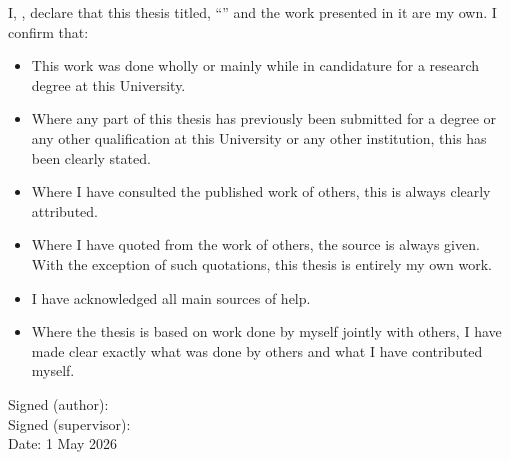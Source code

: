 \documentclass[
11pt, %
oneside, %
ukrainian,
english, %
singlespacing, %
headsepline, %
]{Thesis} %
\begin{document}

\begin{declaration}
\addchaptertocentry{\authorshipname} %
\noindent I, \authorname, declare that this thesis titled, \enquote{\ttitle} and the work presented in it are my own. I confirm that:

\begin{itemize} 
\item This work was done wholly or mainly while in candidature for a research degree at this University.
\item Where any part of this thesis has previously been submitted for a degree or any other qualification at this University or any other institution, this has been clearly stated.
\item Where I have consulted the published work of others, this is always clearly attributed.
\item Where I have quoted from the work of others, the source is always given. With the exception of such quotations, this thesis is entirely my own work.
\item I have acknowledged all main sources of help.
\item Where the thesis is based on work done by myself jointly with others, I have made clear exactly what was done by others and what I have contributed myself.\\
\end{itemize}

\vspace{15em}
\noindent Signed (author): \underline{\hspace{6cm}} \authorname \\
 
\noindent Signed (supervisor): \underline{\hspace{5.4cm}} \supname \\
 
\noindent Date: 1 May 2026

\end{declaration}

\cleardoublepage

\end{document}
